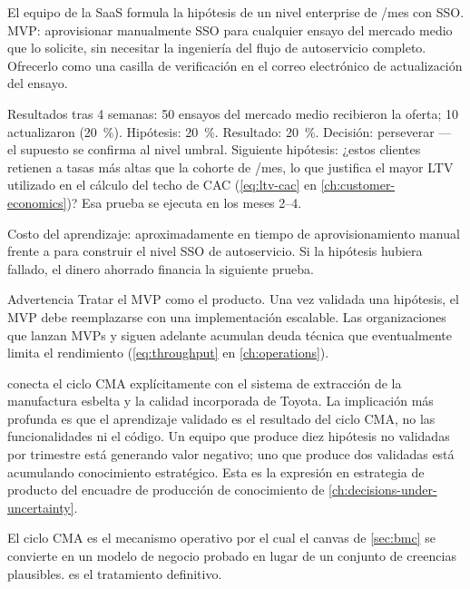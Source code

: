 \begin{example}
El equipo de la SaaS formula la hipótesis de un nivel enterprise de /mes con SSO. MVP: aprovisionar manualmente SSO para cualquier ensayo del mercado medio que lo solicite, sin necesitar la ingeniería del flujo de autoservicio completo. Ofrecerlo como una casilla de verificación en el correo electrónico de actualización del ensayo.

Resultados tras 4 semanas: \num{50} ensayos del mercado medio recibieron la oferta; \num{10} actualizaron (\qty{20}{\percent}). Hipótesis: \qty{20}{\percent}. Resultado: \qty{20}{\percent}. Decisión: perseverar --- el supuesto se confirma al nivel umbral. Siguiente hipótesis: ¿estos clientes retienen a tasas más altas que la cohorte de /mes, lo que justifica el mayor LTV utilizado en el cálculo del techo de CAC (\cref{eq:ltv-cac} en \cref{ch:customer-economics})? Esa prueba se ejecuta en los meses 2--4.

Costo del aprendizaje: aproximadamente  en tiempo de aprovisionamiento manual frente a  para construir el nivel SSO de autoservicio. Si la hipótesis hubiera fallado, el dinero ahorrado financia la siguiente prueba.
\end{example}

\begin{admonition}{Advertencia}
Tratar el MVP como el producto. Una vez validada una hipótesis, el MVP debe reemplazarse con una implementación escalable. Las organizaciones que lanzan MVPs y siguen adelante acumulan deuda técnica que eventualmente limita el rendimiento (\cref{eq:throughput} en \cref{ch:operations}).
\end{admonition}

\textcite{ries2011} conecta el ciclo CMA explícitamente con el sistema de extracción de la manufactura esbelta y la calidad incorporada de Toyota. La implicación más profunda es que el aprendizaje validado es el resultado del ciclo CMA, no las funcionalidades ni el código. Un equipo que produce diez hipótesis no validadas por trimestre está generando valor negativo; uno que produce dos validadas está acumulando conocimiento estratégico. Esta es la expresión en estrategia de producto del encuadre de producción de conocimiento de \cref{ch:decisions-under-uncertainty}.

El ciclo CMA es el mecanismo operativo por el cual el canvas de \cref{sec:bmc} se convierte en un modelo de negocio probado en lugar de un conjunto de creencias plausibles. \textcite{ries2011} es el tratamiento definitivo.

